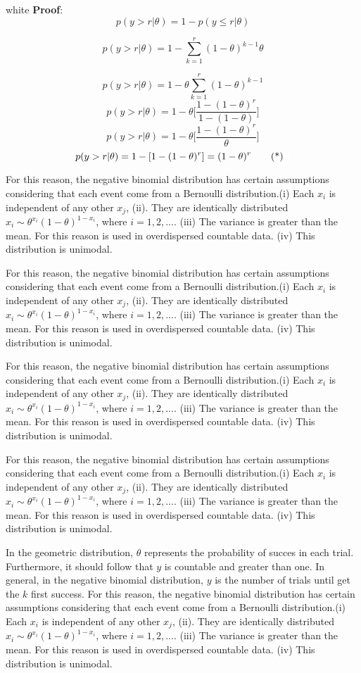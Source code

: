 \documentclass[11pt, a4paper, top=4cm,bottom=3.5cm, right=3cm,left=3cm]{SimpleNotes}
\begin{document}
\begin{sframe}{white}
\textbf{Proof}:
\[p(y>r|\theta)=1-p(y\leq r|\theta)\]

\[p(y>r|\theta)=1-\sum\limits_{k=1}^{r}(1-\theta)^{k-1}\theta\]

\[p(y>r|\theta)=1-\theta\sum\limits_{k=1}^{r}(1-\theta)^{k-1}\]
\[p(y>r|\theta)=1-\theta\bigg[\frac{1-(1-\theta)^r}{1-(1-\theta)}\bigg]\]
\[p(y>r|\theta)=1-\theta\bigg[\frac{1-(1-\theta)^r}{\theta}\bigg]\]
\[p(y>r|\theta)=1-[1-(1-\theta)^r]=(1-\theta)^r\fp\]
\end{sframe}

For this reason, the negative binomial distribution has certain assumptions considering that each event come from a Bernoulli distribution.(i) Each $x_i$ is independent of any other $x_j$, (ii). They are identically distributed $x_i\sim\theta^{x_i}(1-\theta)^{1-x_i}$, where $i =1,2,...$. (iii) The variance is greater than the mean. For this reason is used in overdispersed countable data. (iv) This distribution is unimodal.

For this reason, the negative binomial distribution has certain assumptions considering that each event come from a Bernoulli distribution.(i) Each $x_i$ is independent of any other $x_j$, (ii). They are identically distributed $x_i\sim\theta^{x_i}(1-\theta)^{1-x_i}$, where $i =1,2,...$. (iii) The variance is greater than the mean. For this reason is used in overdispersed countable data. (iv) This distribution is unimodal.

For this reason, the negative binomial distribution has certain assumptions considering that each event come from a Bernoulli distribution.(i) Each $x_i$ is independent of any other $x_j$, (ii). They are identically distributed $x_i\sim\theta^{x_i}(1-\theta)^{1-x_i}$, where $i =1,2,...$. (iii) The variance is greater than the mean. For this reason is used in overdispersed countable data. (iv) This distribution is unimodal.

For this reason, the negative binomial distribution has certain assumptions considering that each event come from a Bernoulli distribution.(i) Each $x_i$ is independent of any other $x_j$, (ii). They are identically distributed $x_i\sim\theta^{x_i}(1-\theta)^{1-x_i}$, where $i =1,2,...$. (iii) The variance is greater than the mean. For this reason is used in overdispersed countable data. (iv) This distribution is unimodal.

In the geometric distribution, $\theta$ represents the probability of succes in each trial. Furthermore, it should follow that $y$ is countable and greater than one. In general, in the negative binomial distribution, $y$ is the number of trials until get the $k$ first success. For this reason, the negative binomial distribution has certain assumptions considering that each event come from a Bernoulli distribution.(i) Each $x_i$ is independent of any other $x_j$, (ii). They are identically distributed $x_i\sim\theta^{x_i}(1-\theta)^{1-x_i}$, where $i =1,2,...$. (iii) The variance is greater than the mean. For this reason is used in overdispersed countable data. (iv) This distribution is unimodal.
\end{document}
